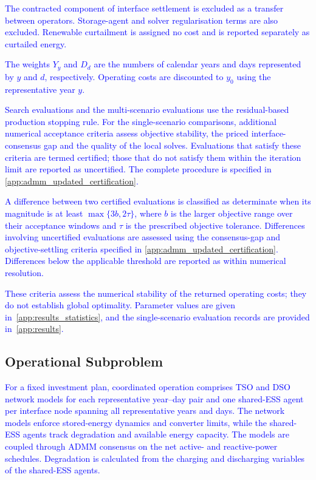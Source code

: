 \documentclass[preprint,12pt]{elsarticle}
\begin{document}
\textcolor{blue}{
    The contracted component of interface settlement is excluded as a transfer between operators. Storage-agent and solver regularisation terms are also excluded. Renewable curtailment is assigned no cost and is reported separately as curtailed energy.
}

\textcolor{blue}{
    The weights $Y_y$ and $D_d$ are the numbers of calendar years and days represented by $y$ and $d$, respectively. Operating costs are discounted to $y_0$ using the representative year $y$.
}

\textcolor{blue}{
    Search evaluations and the multi-scenario evaluations use the residual-based production stopping rule. 
    For the single-scenario comparisons, additional numerical acceptance criteria assess objective stability, the priced interface-consensus gap and the quality of the local solves.
    Evaluations that satisfy these criteria are termed certified; those that do not satisfy them within the iteration limit are reported as uncertified. 
    The complete procedure is specified in \ref{app:admm_updated_certification}.
}

\textcolor{blue}{
    A difference between two certified evaluations is classified as determinate when its magnitude is at least $\max\{3b,2\tau\}$, where $b$ is the larger objective range over their acceptance windows and $\tau$ is the prescribed objective tolerance. Differences involving uncertified evaluations are assessed using the consensus-gap and objective-settling criteria specified in \ref{app:admm_updated_certification}. Differences below the applicable threshold are reported as within numerical resolution.
}

\textcolor{blue}{
    These criteria assess the numerical stability of the returned operating costs; they do not establish global optimality. 
    Parameter values are given in~\ref{app:results_statistics}, and the single-scenario evaluation records are provided in~\ref{app:results}.
}

\subsection{Operational Subproblem}
\label{subsec:subproblem}

\textcolor{blue}{
    For a fixed investment plan, coordinated operation comprises TSO and DSO network models for each representative year--day pair and one shared-ESS agent per interface node spanning all representative years and days. The network models enforce stored-energy dynamics and converter limits, while the shared-ESS agents track degradation and available energy capacity. The models are coupled through ADMM consensus on the net active- and reactive-power schedules.
    Degradation is calculated from the charging and discharging variables of the shared-ESS agents.
}
\end{document}
